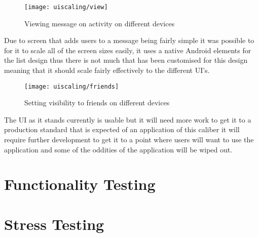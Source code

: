 \begin{figure}[H]
    \centering
    \texttt{[image: uiscaling/view]}
    \caption{Viewing message on activity on different devices}
    \label{fig:ui_scaling_view_image}
\end{figure} 

\noindent
Due to screen that adds users to a message being fairly simple it was possible to for it to scale all of the screen sizes easily, it uses a native Android elements for the list design thus there is not much that has been customised for this design meaning that it should scale fairly effectively to the different UI's.

\begin{figure}[H]
    \centering
    \texttt{[image: uiscaling/friends]}
    \caption{Setting visibility to friends on different devices}
    \label{fig:ui_scaling_friends_image}
\end{figure} 

\noindent
The UI as it stands currently is usable but it will need more work to get it to a production standard that is expected of an application of this caliber it will require further development to get it to a point where users will want to use the application and some of the oddities of the application will be wiped out.

\section{Functionality Testing}

\section{Stress Testing}

